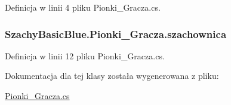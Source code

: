 Definicja w linii 4 pliku Pionki\-\_\-\-Gracza.\-cs.

\hypertarget{class_szachy_basic_blue_1_1_pionki___gracza_aa9823f1f70be577121fa7956e143858d}{
\subsubsection[{szachownica}]{ Szachy\-Basic\-Blue.\-Pionki\-\_\-\-Gracza.\-szachownica\hspace{0.3cm}{\ttfamily [private]}}}\label{class_szachy_basic_blue_1_1_pionki___gracza_aa9823f1f70be577121fa7956e143858d}


Definicja w linii 12 pliku Pionki\-\_\-\-Gracza.\-cs.



Dokumentacja dla tej klasy została wygenerowana z pliku\-:\begin{DoxyCompactItemize}
\item 
\hyperlink{_pionki___gracza_8cs}{Pionki\-\_\-\-Gracza.\-cs}\end{DoxyCompactItemize}
